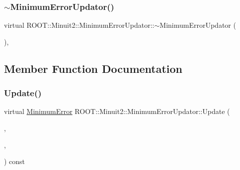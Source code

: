 \mbox{\label{classROOT_1_1Minuit2_1_1MinimumErrorUpdator_aae3f2641888e9c351f256a83c455d207}} 
\subsubsection{\texorpdfstring{$\sim$MinimumErrorUpdator()}{~MinimumErrorUpdator()}\hspace{0.1cm}{\footnotesize\ttfamily [2/2]}}
{\footnotesize\ttfamily virtual R\+O\+O\+T\+::\+Minuit2\+::\+Minimum\+Error\+Updator\+::$\sim$\+Minimum\+Error\+Updator (\begin{DoxyParamCaption}{ }\end{DoxyParamCaption})\hspace{0.3cm}{\ttfamily [inline]}, {\ttfamily [virtual]}}



\subsection{Member Function Documentation}
\mbox{\label{classROOT_1_1Minuit2_1_1MinimumErrorUpdator_ae75c33152c49ebf34e6119adc0bbbda9}} 
\subsubsection{\texorpdfstring{Update()}{Update()}\hspace{0.1cm}{\footnotesize\ttfamily [1/2]}}
{\footnotesize\ttfamily virtual \mbox{\hyperlink{classROOT_1_1Minuit2_1_1MinimumError}{Minimum\+Error}} R\+O\+O\+T\+::\+Minuit2\+::\+Minimum\+Error\+Updator\+::\+Update (\begin{DoxyParamCaption}\item[{const \mbox{\hyperlink{classROOT_1_1Minuit2_1_1MinimumState}{Minimum\+State}} \&}]{,  }\item[{const \mbox{\hyperlink{classROOT_1_1Minuit2_1_1MinimumParameters}{Minimum\+Parameters}} \&}]{,  }\item[{const \mbox{\hyperlink{classROOT_1_1Minuit2_1_1FunctionGradient}{Function\+Gradient}} \&}]{ }\end{DoxyParamCaption}) const\hspace{0.3cm}{\ttfamily [pure virtual]}}



